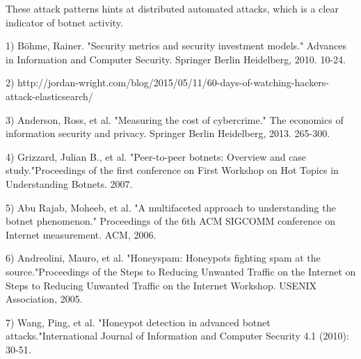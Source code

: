 These attack patterns hints at distributed automated attacks, which is a clear indicator of botnet activity.

1) Böhme, Rainer. "Security metrics and security investment models." Advances in Information and Computer Security. Springer Berlin Heidelberg, 2010. 10-24.

2) http://jordan-wright.com/blog/2015/05/11/60-days-of-watching-hackers-attack-elasticsearch/

3) Anderson, Ross, et al. "Measuring the cost of cybercrime." The economics of information security and privacy. Springer Berlin Heidelberg, 2013. 265-300.

4) Grizzard, Julian B., et al. "Peer-to-peer botnets: Overview and case study."Proceedings of the first conference on First Workshop on Hot Topics in Understanding Botnets. 2007.

5) Abu Rajab, Moheeb, et al. "A multifaceted approach to understanding the botnet phenomenon." Proceedings of the 6th ACM SIGCOMM conference on Internet measurement. ACM, 2006.

6) Andreolini, Mauro, et al. "Honeyspam: Honeypots fighting spam at the source."Proceedings of the Steps to Reducing Unwanted Traffic on the Internet on Steps to Reducing Unwanted Traffic on the Internet Workshop. USENIX Association, 2005.

7) Wang, Ping, et al. "Honeypot detection in advanced botnet attacks."International Journal of Information and Computer Security 4.1 (2010): 30-51.


